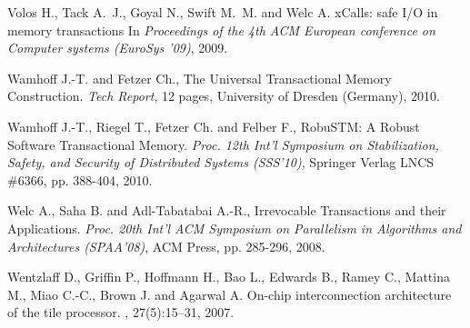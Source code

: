 \begin{thebibliography}{99}
{
Volos H., Tack A.~J., Goyal N., Swift M.~M. and Welc A.
\newblock xCalls: safe I/O in memory transactions
\newblock In {\em Proceedings of the 4th ACM European conference on Computer systems (EuroSys '09)}, 2009.


Wamhoff J.-T. and   Fetzer Ch., 
The Universal Transactional Memory Construction. 
{\it Tech Report}, 12 pages, University of Dresden (Germany), 2010. 
 

Wamhoff J.-T.,   Riegel T.,  Fetzer Ch. and  Felber F., 
RobuSTM: A Robust Software Transactional Memory.
{\it Proc. 12th Int'l Symposium on  Stabilization, Safety, and Security 
of Distributed Systems (SSS'10)}, 
Springer Verlag LNCS \#6366, pp.  388-404,  2010. 

Welc A., Saha B. and Adl-Tabatabai A.-R., 
Irrevocable Transactions and their Applications. 
{\it  Proc. 20th  Int'l  ACM Symposium on Parallelism in Algorithms 
and Architectures   (SPAA'08)},  ACM Press, pp. 285-296,  2008. 


Wentzlaff D., Griffin P., Hoffmann H., Bao L., Edwards B., Ramey C.,
  Mattina M., Miao C.-C., Brown J. and Agarwal A.
\newblock On-chip interconnection architecture of the tile processor.
, 27(5):15--31, 2007.


}
\end{thebibliography}
